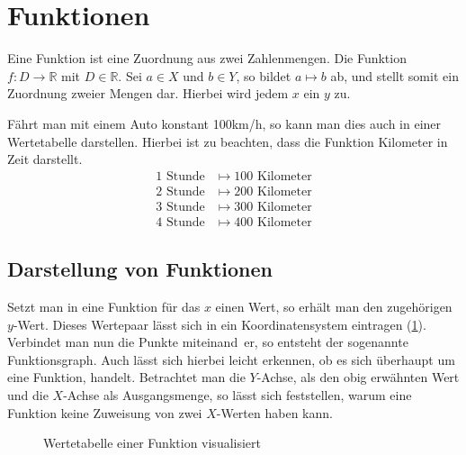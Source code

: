 \pagebreak
\section{Funktionen}\label{sec:Die Funktion}
Eine Funktion ist eine Zuordnung aus zwei Zahlenmengen. Die Funktion $f:D\rightarrow \mathbb{R}$ mit $D\in \mathbb{R}$. Sei $a\in X$ und $b\in Y$, so bildet $a\mapsto b$ ab, und stellt somit ein Zuordnung zweier Mengen dar. Hierbei wird jedem $x$ ein $y$ zu. 

\begin{beispiel} Fährt man mit einem Auto konstant 100km/h, so kann man dies auch in einer Wertetabelle darstellen. Hierbei ist zu beachten, dass die Funktion Kilometer in Zeit darstellt.
\begin{align*}
	1 \text{ Stunde}&\mapsto100 \text{ Kilometer}\\
	2 \text{ Stunde}&\mapsto200 \text{ Kilometer}\\
	3 \text{ Stunde}&\mapsto300 \text{ Kilometer}\\
	4 \text{ Stunde}&\mapsto400 \text{ Kilometer}
\end{align*}
\end{beispiel}
\subsection{Darstellung von Funktionen}\label{sec:Die Funktion/Darstellen von Funktionen}
Setzt man in eine Funktion für das $x$ einen Wert, so erhält man den zugehörigen $y$-Wert. Dieses Wertepaar lässt sich in ein Koordinatensystem eintragen (\ref{sec:Wertetabelle_einer_Funktion_visualisiert}). Verbindet man nun die Punkte miteinand er, so entsteht der sogenannte Funktionsgraph. Auch lässt sich hierbei leicht erkennen, ob es sich überhaupt um eine Funktion, handelt. Betrachtet man die $Y$-Achse, als den obig erwähnten Wert und die $X$-Achse als Ausgangsmenge, so lässt sich feststellen, warum eine Funktion keine Zuweisung von zwei $X$-Werten haben kann.
\begin{figure}[h!]
\centering
{}
\caption{Wertetabelle einer Funktion visualisiert}
\label{sec:Wertetabelle_einer_Funktion_visualisiert}
\end{figure}

 
